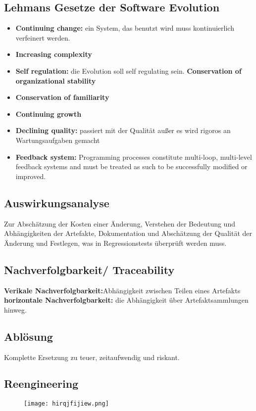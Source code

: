 \documentclass{book}
\begin{document}
    \subsection{Lehmans Gesetze der Software Evolution}
    \begin{itemize}
        \item \textbf{Continuing change:} ein System, das benutzt wird muss kontinuierlich verfeinert werden.
        \item \textbf{Increasing complexity}
        \item \textbf{Self regulation: } die Evolution soll self regulating sein.
        \textbf{Conservation of organizational stability}
        \item \textbf{Conservation of familiarity}
        \item \textbf{Continuing growth}
        \item \textbf{Declining quality:} passiert mit der Qualität außer es wird rigoros an Wartungsaufgaben gemacht
        \item \textbf{Feedback system: }Programming processes constitute multi-loop,
        multi-level feedback systems and must be treated as such to be
        successfully modified or improved.
    \end{itemize}
    \subsection{Auswirkungsanalyse}
    Zur Abschätzung der Kosten einer Änderung, Verstehen der Bedeutung und Abhängigkeiten der Artefakte, Dokumentation und Abschätzung der Qualität der Änderung und Festlegen, was in Regressionstests überprüft werden muss.
    \subsection{Nachverfolgbarkeit/ Traceability}
    \textbf{Verikale Nachverfolgbarkeit:}Abhängigkeit zwischen Teilen eines Artefakts
    \newline
    \textbf{horizontale Nachverfolgbarkeit:} die Abhängigkeit über Artefaktsammlungen hinweg.
    \subsection{Ablösung}
    Komplette Ersetzung zu teuer, zeitaufwendig und riskant.
    \clearpage
    \subsection{Reengineering}
    \begin{figure}[H]
        \centering
        \texttt{[image: hirqjfijiew.png]}
        \label{fig:enter-label}
    \end{figure}
\end{document}
